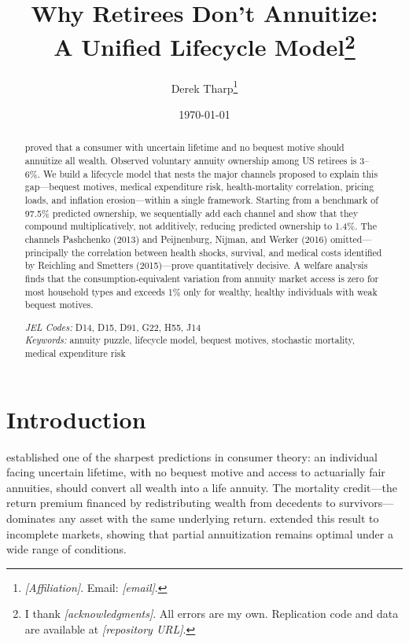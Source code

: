 \documentclass[12pt]{article}
\title{Why Retirees Don't Annuitize: \\
A Unified Lifecycle Model\thanks{%
I thank \textit{[acknowledgments]}. All errors are my own. Replication code and data are available at \textit{[repository URL]}.}}
\author{Derek Tharp\thanks{%
\textit{[Affiliation]}. Email: \textit{[email]}.}}
\date{\today}
\begin{document}
\maketitle

\begin{abstract}
\noindent
\citet{yaari1965} proved that a consumer with uncertain lifetime and no bequest motive should annuitize all wealth. Observed voluntary annuity ownership among US retirees is 3--6\%. We build a lifecycle model that nests the major channels proposed to explain this gap---bequest motives, medical expenditure risk, health-mortality correlation, pricing loads, and inflation erosion---within a single framework. Starting from a benchmark of 97.5\% predicted ownership, we sequentially add each channel and show that they compound multiplicatively, not additively, reducing predicted ownership to 1.4\%. The channels Pashchenko (2013) and Peijnenburg, Nijman, and Werker (2016) omitted---principally the correlation between health shocks, survival, and medical costs identified by Reichling and Smetters (2015)---prove quantitatively decisive. A welfare analysis finds that the consumption-equivalent variation from annuity market access is zero for most household types and exceeds 1\% only for wealthy, healthy individuals with weak bequest motives.

\bigskip
\noindent
\textit{JEL Codes:} D14, D15, D91, G22, H55, J14 \\
\textit{Keywords:} annuity puzzle, lifecycle model, bequest motives, stochastic mortality, medical expenditure risk
\end{abstract}

\newpage


\section{Introduction}
\label{sec:intro}

\citet{yaari1965} established one of the sharpest predictions in consumer theory: an individual facing uncertain lifetime, with no bequest motive and access to actuarially fair annuities, should convert all wealth into a life annuity. The mortality credit---the return premium financed by redistributing wealth from decedents to survivors---dominates any asset with the same underlying return. \citet{davidoff2005} extended this result to incomplete markets, showing that partial annuitization remains optimal under a wide range of conditions.
\end{document}
